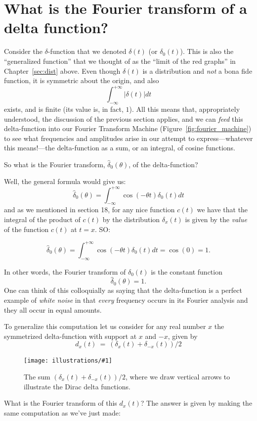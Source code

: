 \documentclass[openany]{book}
\newcommand{\ill}[3]{%
   \begin{figure}[H]%
   \vspace{-2ex}
   \centering%
   \texttt{[image: illustrations/\#1]}%
   \caption{#3}%
   \vspace{-2ex}
    \end{figure}}
\theoremstyle{plain}
\theoremstyle{definition}
\begin{document}
\chapter[Fourier transform of delta]{What is the Fourier transform of a delta function?\label{sec:ftdelta}}

Consider the $\delta$-function that we denoted $\delta(t)$ (or
$\delta_0(t)$). This is also the ``generalized function'' that we
thought of as the ``limit of the red graphs'' in Chapter~\ref{sec:dist}
above. Even though $\delta(t)$ is a distribution and {\it not} a bona
fide function, it is symmetric about the origin, and
also $$\int_{-{\infty}}^{+{\infty}}|\delta(t)|dt$$ exists, and is
finite (its value is, in fact, $1$). All this means that,
appropriately understood, the discussion of the previous section
applies, and we can {\it feed} this delta-function into our Fourier
Transform Machine (Figure~\ref{fig:fourier_machine}) to see what
frequencies and amplitudes arise in our attempt to express---whatever
this means!---the delta-function as a sum, or an integral, of cosine
functions.


     So what is the Fourier transform,  ${\hat \delta_0}(\theta)$, of the delta-function?


Well, the general formula would give us:
  $$ {\hat \delta_0}(\theta) = \int_{-\infty}^{+\infty}\cos(-\theta t)\delta_0(t)dt$$
  and as we mentioned in section 18, for any nice function $c(t)$ we
  have that the integral of the product of $c(t)$ by the distribution
  $\delta_x(t)$ is given by the {\it value} of the function $c(t)$ at
  $t=x$.  SO:

$$ {\hat \delta_0}(\theta) = \int_{-\infty}^{+\infty}\cos(-\theta t)\delta_0(t)dt = \cos(0) = 1.$$


In other words, the Fourier transform of $\delta_0(t)$ is the constant
function $$ {\hat \delta_0}(\theta)=1.$$ One can think of this
colloquially as saying that the delta-function is a perfect example of
{\it white noise} in that {\it every} frequency occurs in its Fourier
analysis and they all occur in equal amounts.

To generalize this computation let us consider for any real number $x$
the symmetrized delta-function with support at $x$ and $-x$, given
by $$d_x(t) \ = \ (\delta_x(t) + \delta_{-x}(t))/2$$


    \ill{two_delta}{0.4}{The sum $(\delta_x(t) + \delta_{-x}(t))/2$, where we draw vertical arrows to illustrate the Dirac delta functions.}

    What is the Fourier transform of this $d_x(t)$?  The answer is
    given by making the same computation as we've just made:
\end{document}
